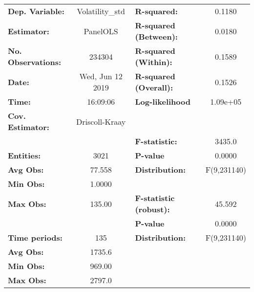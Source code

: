 \begin{center}
\begin{tabular}{lclc}
\toprule
\textbf{Dep. Variable:}                &   Volatility_std   & \textbf{  R-squared:         }   &      0.1180      \\
\textbf{Estimator:}                    &      PanelOLS      & \textbf{  R-squared (Between):}  &      0.0180      \\
\textbf{No. Observations:}             &       234304       & \textbf{  R-squared (Within):}   &      0.1589      \\
\textbf{Date:}                         &  Wed, Jun 12 2019  & \textbf{  R-squared (Overall):}  &      0.1526      \\
\textbf{Time:}                         &      16:09:06      & \textbf{  Log-likelihood     }   &     1.09e+05     \\
\textbf{Cov. Estimator:}               &   Driscoll-Kraay   & \textbf{                     }   &                  \\
\textbf{}                              &                    & \textbf{  F-statistic:       }   &      3435.0      \\
\textbf{Entities:}                     &        3021        & \textbf{  P-value            }   &      0.0000      \\
\textbf{Avg Obs:}                      &       77.558       & \textbf{  Distribution:      }   &   F(9,231140)    \\
\textbf{Min Obs:}                      &       1.0000       & \textbf{                     }   &                  \\
\textbf{Max Obs:}                      &       135.00       & \textbf{  F-statistic (robust):} &      45.592      \\
\textbf{}                              &                    & \textbf{  P-value            }   &      0.0000      \\
\textbf{Time periods:}                 &        135         & \textbf{  Distribution:      }   &   F(9,231140)    \\
\textbf{Avg Obs:}                      &       1735.6       & \textbf{                     }   &                  \\
\textbf{Min Obs:}                      &       969.00       & \textbf{                     }   &                  \\
\textbf{Max Obs:}                      &       2797.0       & \textbf{                     }   &                  \\

\end{tabular}
\end{center}

